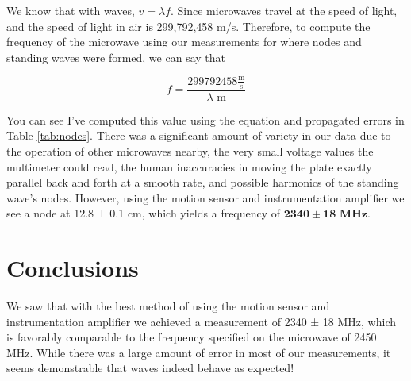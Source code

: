 \documentclass[12pt,letterpaper]{article}
\begin{document}
We know that with waves, $v=\lambda f$. Since microwaves travel at the speed of light, and the speed of light in air is 299,792,458 m/s. Therefore, to compute the frequency of the microwave using our measurements for where nodes and standing waves were formed, we can say that 

\begin{equation}
    f=\frac{299792458 \frac{\text{m}}{\text{s}}}{\lambda \text{ m}}
\end{equation}

You can see I've computed this value using the equation and propagated errors in Table \ref{tab:nodes}. There was a significant amount of variety in our data due to the operation of other microwaves nearby, the very small voltage values the multimeter could read, the human inaccuracies in moving the plate exactly parallel back and forth at a smooth rate, and possible harmonics of the standing wave's nodes. However, using the motion sensor and instrumentation amplifier we see a node at 12.8 ± 0.1 cm, which yields a frequency of $\mathbf{2340 \pm 18} \textbf{ MHz}$.


\section{Conclusions}

We saw that with the best method of using the motion sensor and instrumentation amplifier we achieved a measurement of 2340 ± 18 MHz, which is favorably comparable to the frequency specified on the microwave of 2450 MHz. While there was a large amount of error in most of our measurements, it seems demonstrable that waves indeed behave as expected!


% 
% 
\end{document}
